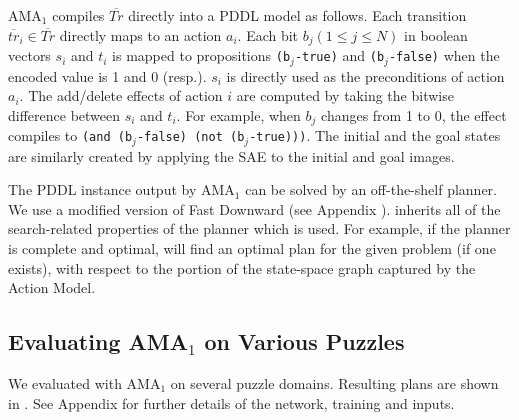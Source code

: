 \documentclass[11pt]{article}
\begin{document}
AMA$_1$ compiles $\overline{Tr}$ directly into a PDDL model as follows.
Each transition $\overline{tr}_i \in \overline{Tr}$ directly maps to an action $a_i$.
Each bit $b_j (1 \leq j \leq N)$ in boolean vectors $s_i$ and $t_i$ is mapped to propositions \texttt{(b$_j$-true)} and \texttt{(b$_j$-false)} when the encoded value is 1 and 0 (resp.). 
$s_i$ is directly used as the preconditions of action $a_i$.
The add/delete effects of action $i$ are computed by taking the bitwise difference between $s_i$ and $t_i$.
For example, when $b_j$ changes from 1 to 0, the effect compiles to \texttt{(and (b$_j$-false) (not (b$_j$-true)))}.
The initial and the goal states are similarly created by applying the SAE to the initial and goal images.

The PDDL instance output by AMA$_1$ can be solved by an off-the-shelf planner.
We use a modified version of Fast Downward \cite{Helmert2006} (see Appendix ).
\latentplanner inherits all of the search-related properties of the planner which is used. 
For example, if the planner is complete and optimal, \latentplanner will find an optimal plan for the given problem (if one exists), with respect to the portion of the state-space graph captured by the Action Model.




\subsection{Evaluating AMA$_1$ on Various Puzzles}

\label{sec:ama1-experiments}

We evaluated \latentplanner with AMA$_1$ on several puzzle domains.
Resulting plans are shown in .
See Appendix  for further details of the network, training and inputs.
\end{document}
